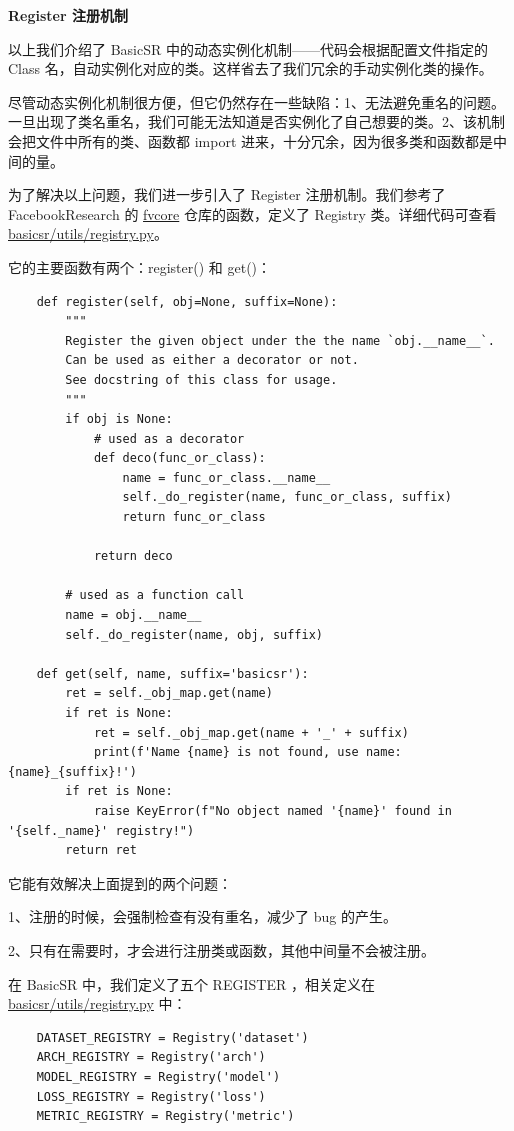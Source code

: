 \documentclass[../main.tex]{subfiles}
\begin{document}
    \textbf{Register 注册机制}

    以上我们介绍了 BasicSR 中的动态实例化机制——代码会根据配置文件指定的Class 名，自动实例化对应的类。这样省去了我们冗余的手动实例化类的操作。

    尽管动态实例化机制很方便，但它仍然存在一些缺陷：1、无法避免重名的问题。一旦出现了类名重名，我们可能无法知道是否实例化了自己想要的类。2、该机制会把文件中所有的类、函数都 import 进来，十分冗余，因为很多类和函数都是中间的量。

    为了解决以上问题，我们进一步引入了 Register 注册机制。我们参考了 FacebookResearch 的 \href{https://github.com/facebookresearch/fvcore}{fvcore} 仓库的函数，定义了 Registry 类。详细代码可查看 \href{https://github.com/XPixelGroup/BasicSR/blob/master/basicsr/utils/registry.py}{basicsr/utils/registry.py}。

    它的主要函数有两个：register() 和 get()：
    \begin{verbatim}
    def register(self, obj=None, suffix=None):
        """
        Register the given object under the the name `obj.__name__`.
        Can be used as either a decorator or not.
        See docstring of this class for usage.
        """
        if obj is None:
            # used as a decorator
            def deco(func_or_class):
                name = func_or_class.__name__
                self._do_register(name, func_or_class, suffix)
                return func_or_class

            return deco

        # used as a function call
        name = obj.__name__
        self._do_register(name, obj, suffix)

    def get(self, name, suffix='basicsr'):
        ret = self._obj_map.get(name)
        if ret is None:
            ret = self._obj_map.get(name + '_' + suffix)
            print(f'Name {name} is not found, use name: {name}_{suffix}!')
        if ret is None:
            raise KeyError(f"No object named '{name}' found in '{self._name}' registry!")
        return ret
    \end{verbatim}

    它能有效解决上面提到的两个问题：

    1、注册的时候，会强制检查有没有重名，减少了 bug 的产生。

    2、只有在需要时，才会进行注册类或函数，其他中间量不会被注册。

    在 BasicSR 中，我们定义了五个 REGISTER ，相关定义在 \href{https://github.com/XPixelGroup/BasicSR/blob/master/basicsr/utils/registry.py}{basicsr/utils/registry.py} 中：
    \begin{verbatim}
    DATASET_REGISTRY = Registry('dataset')
    ARCH_REGISTRY = Registry('arch')
    MODEL_REGISTRY = Registry('model')
    LOSS_REGISTRY = Registry('loss')
    METRIC_REGISTRY = Registry('metric')
    \end{verbatim}
\end{document}

